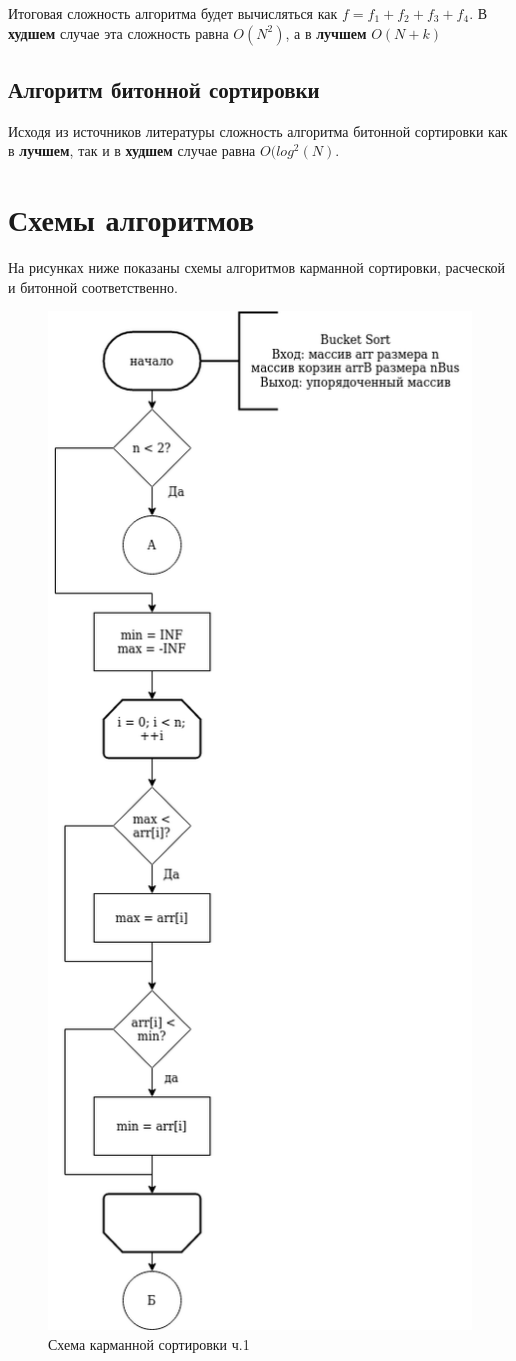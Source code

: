 \documentclass[12pt]{report}
\begin{document}
	Итоговая сложность алгоритма будет вычисляться как $f = f_{1} + f_{2} + f_{3} + f_{4}$. В \textbf{худшем} случае эта сложность равна $O(N^2)$, а в \textbf{лучшем} $O(N + k)$
	
	\subsection{Алгоритм битонной сортировки}
	
	Исходя из источников литературы сложность алгоритма битонной сортировки как в \textbf{лучшем}, так и в \textbf{худшем} случае равна $O(log^{2}(N)$.
	
	\section{Схемы алгоритмов}
	
	
	На рисунках ниже показаны схемы алгоритмов карманной сортировки, расческой и битонной соответственно.
	
	\begin{figure}[H]
		\centering
		\includegraphics[width=0.3\linewidth]{bucket_1}
		\caption{Схема карманной сортировки ч.1}
		\label{fig:schema_bucket_1}
	\end{figure}
	
\end{document}
